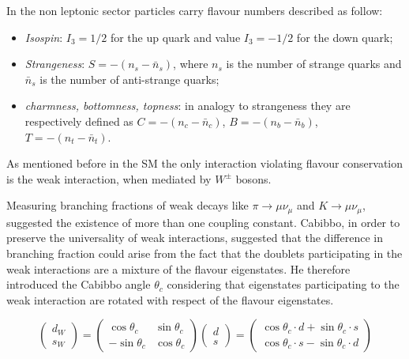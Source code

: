 In the non leptonic sector particles carry flavour numbers described as follow:

 \begin{itemize}
 \item \emph{Isospin}: $I_3 = 1/2$ for the up quark and value $I_3 = -1/2$ for the down quark;
 \item \emph{Strangeness}: $S = -(n_s - \bar{n}_s)$, where $n_s$ is the number of strange quarks and $\bar{n}_s$ is the number of anti-strange quarks;
 \item \emph{charmness, bottomness, topness}: in analogy to strangeness
 they are respectively defined as $C = -(n_c - \bar{n}_c)$, $B = -(n_b - \bar{n}_b)$, $T = -(n_t - \bar{n}_t)$.
 \end{itemize}

As mentioned before in the SM the only interaction violating flavour conservation is the weak interaction,
when mediated by $W^\pm$ bosons.

Measuring branching fractions of weak decays like $\pi \rightarrow \mu \nu_\mu$ and $K \rightarrow \mu \nu_\mu$, 
suggested the existence of more than one coupling constant. Cabibbo\cite{PDG2012}, in order to preserve the universality
of weak interactions, suggested that the difference in branching fraction could arise from the fact that
the doublets participating in the weak interactions are a mixture of the flavour eigenstates. He therefore introduced
the Cabibbo angle $\theta_c$ considering that eigenstates participating to the weak interaction are rotated with respect
of the flavour eigenstates.

\begin{equation}
\left( \begin{array}{c}
d_W \\ s_W
\end{array} \right) =
\left( \begin{array}{cc}
\cos \theta_c  & \sin \theta_c\\
-\sin \theta_c & \cos \theta_c
\end{array} \right)
\left( \begin{array}{c}
d \\ s
\end{array} \right) = 
\left( \begin{array}{c}
\cos\theta_c \cdot d + \sin \theta_c \cdot s \\
\cos \theta_c \cdot s - \sin \theta_c \cdot d
\end{array} \right)
\end{equation}

